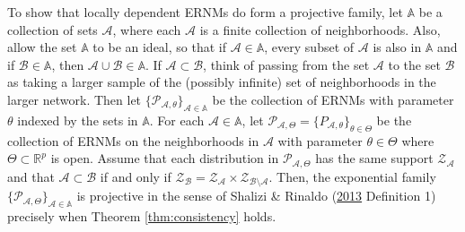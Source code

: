 \documentclass[12pt,twoside]{reedthesis}
\theoremstyle{definition}
\theoremstyle{definition}
\theoremstyle{remark}
\begin{document}
To show that locally dependent ERNMs do form a projective family, let
\(\mathbb{A}\) be a collection of sets \(\mathcal{A}\), where each
\(\mathcal{A}\) is a finite collection of neighborhoods. Also, allow the
set \(\mathbb{A}\) to be an ideal, so that if
\(\mathcal{A} \in \mathbb{A}\), every subset of \(\mathcal{A}\) is also
in \(\mathbb{A}\) and if \(\mathcal{B} \in \mathbb{A}\), then
\(\mathcal{A} \cup \mathcal{B} \in \mathbb{A}\). If
\(\mathcal{A} \subset \mathcal{B}\), think of passing from the set
\(\mathcal{A}\) to the set \(\mathcal{B}\) as taking a larger sample of
the (possibly infinite) set of neighborhoods in the larger network. Then
let
\(\{\mathcal{P}_{\mathcal{A}, \theta}\}_{\mathcal{A} \in \mathbb{A}}\)
be the collection of ERNMs with parameter \(\theta\) indexed by the sets
in \(\mathbb{A}\). For each \(\mathcal{A} \in \mathbb{A}\), let
\(\mathcal{P}_{\mathcal{A}, \Theta} = \{P_{\mathcal{A}, \theta}\}_{\theta \in \Theta}\)
be the collection of ERNMs on the neighborhoods in \(\mathcal{A}\) with
parameter \(\theta \in \Theta\) where \(\Theta \subset \mathbb{R}^{p}\)
is open. Assume that each distribution in
\(\mathcal{P}_{\mathcal{A}, \Theta}\) has the same support
\(\mathcal{Z}_{\mathcal{A}}\) and that
\(\mathcal{A} \subset \mathcal{B}\) if and only if
\(\mathcal{Z}_{\mathcal{B}} = \mathcal{Z}_{\mathcal{A}} \times \mathcal{Z}_{\mathcal{B} \setminus \mathcal{A}}\).
Then, the exponential family
\(\{\mathcal{P}_{\mathcal{A}, \Theta}\}_{\mathcal{A} \in \mathbb{A}}\)
is projective in the sense of Shalizi \& Rinaldo
(\protect\hyperlink{ref-Shalizi2013}{2013} Definition 1) precisely when
Theorem \ref{thm:consistency} holds.
\end{document}
